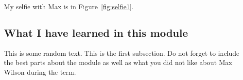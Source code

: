My selfie with Max is in  Figure~\ref{fig:selfie1}.

\subsection{What I have learned in this module}
This is some random text.
This is the first subsection. Do not forget to include the best parts about the module as well as what you did not like about Max Wilson during the term.
